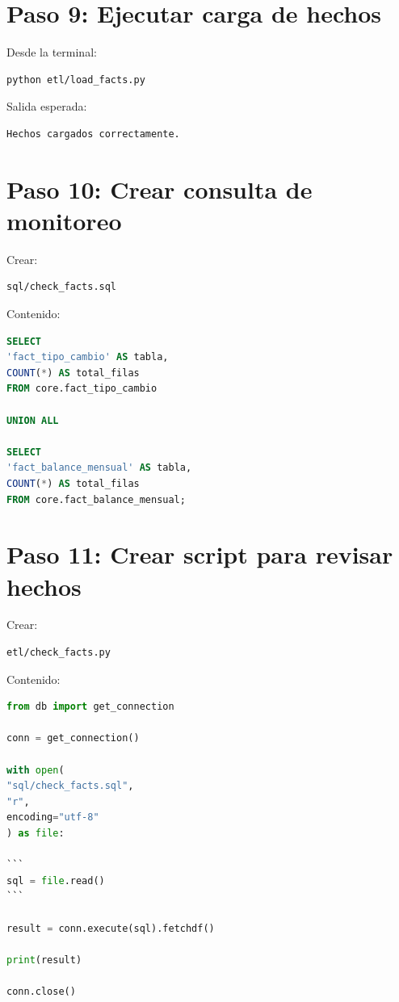 \section{Paso 9: Ejecutar carga de hechos}

Desde la terminal:

\begin{lstlisting}[language=bash]
python etl/load_facts.py
\end{lstlisting}

Salida esperada:

\begin{verbatim}
Hechos cargados correctamente.
\end{verbatim}

\section{Paso 10: Crear consulta de monitoreo}

Crear:

\begin{verbatim}
sql/check_facts.sql
\end{verbatim}

Contenido:

\begin{lstlisting}[language=SQL]
SELECT
'fact_tipo_cambio' AS tabla,
COUNT(*) AS total_filas
FROM core.fact_tipo_cambio

UNION ALL

SELECT
'fact_balance_mensual' AS tabla,
COUNT(*) AS total_filas
FROM core.fact_balance_mensual;
\end{lstlisting}

\section{Paso 11: Crear script para revisar hechos}

Crear:

\begin{verbatim}
etl/check_facts.py
\end{verbatim}

Contenido:

\begin{lstlisting}[language=Python]
from db import get_connection

conn = get_connection()

with open(
"sql/check_facts.sql",
"r",
encoding="utf-8"
) as file:

```
sql = file.read()
```

result = conn.execute(sql).fetchdf()

print(result)

conn.close()
\end{lstlisting}


